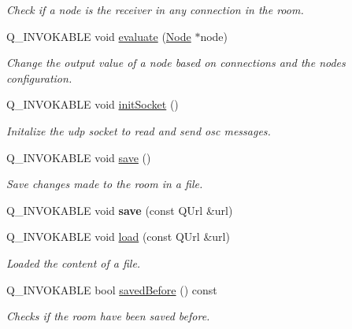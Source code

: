 \begin{DoxyCompactItemize}
\begin{DoxyCompactList}\small\item\em Check if a node is the receiver in any connection in the room. \end{DoxyCompactList}\item 
Q\+\_\+\+I\+N\+V\+O\+K\+A\+B\+LE void \mbox{\hyperlink{classRoom_a0f8b282b43bd3115e24f6b9bd95d92a9}{evaluate}} (\mbox{\hyperlink{classNode}{Node}} $\ast$node)
\begin{DoxyCompactList}\small\item\em Change the output value of a node based on connections and the nodes\textquotesingle{} configuration. \end{DoxyCompactList}\item 
\mbox{\label{classRoom_a4d01284c86cb970b25b0fcfa45cdd38e}} 
Q\+\_\+\+I\+N\+V\+O\+K\+A\+B\+LE void \mbox{\hyperlink{classRoom_a4d01284c86cb970b25b0fcfa45cdd38e}{init\+Socket}} ()
\begin{DoxyCompactList}\small\item\em Initalize the udp socket to read and send osc messages. \end{DoxyCompactList}\item 
Q\+\_\+\+I\+N\+V\+O\+K\+A\+B\+LE void \mbox{\hyperlink{classRoom_ad795aa64d503519ba0777e3f1d81e54c}{save}} ()
\begin{DoxyCompactList}\small\item\em Save changes made to the room in a file. \end{DoxyCompactList}\item 
\mbox{\label{classRoom_a10b12560a3fbd161c0175a2f6edb9a9d}} 
Q\+\_\+\+I\+N\+V\+O\+K\+A\+B\+LE void {\bfseries save} (const Q\+Url \&url)
\item 
Q\+\_\+\+I\+N\+V\+O\+K\+A\+B\+LE void \mbox{\hyperlink{classRoom_a26065830b40a3a127ee2686d9feb4b74}{load}} (const Q\+Url \&url)
\begin{DoxyCompactList}\small\item\em Loaded the content of a file. \end{DoxyCompactList}\item 
Q\+\_\+\+I\+N\+V\+O\+K\+A\+B\+LE bool \mbox{\hyperlink{classRoom_a05135b32eee12b1f69ce0a0497ce6f9e}{saved\+Before}} () const
\begin{DoxyCompactList}\small\item\em Checks if the room have been saved before. \end{DoxyCompactList}\item 

\end{DoxyCompactItemize}
